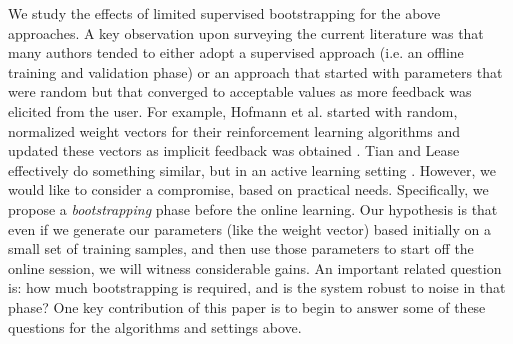 \documentclass{acm_proc_article-sp}
\begin{document}
We study the effects of limited supervised bootstrapping for the above approaches. A key observation upon surveying the current literature was that many authors tended to either adopt a supervised approach (i.e. an offline training and validation phase) or an approach that started with parameters that were random but that converged to acceptable values as more feedback was elicited from the user. For example, Hofmann et al. started with random, normalized weight vectors for their reinforcement learning algorithms and updated these vectors as implicit feedback was obtained \cite{hofmann}. Tian and Lease effectively do something similar, but in an active learning setting \cite{aibo}. However, we would like to consider a compromise, based on practical needs. Specifically, we propose a \emph{bootstrapping} phase before the online learning. Our hypothesis is that even if we generate our parameters (like the weight vector) based initially on a small set of training samples, and then use those parameters to start off the online session, we will witness considerable gains. An important related question is: how much bootstrapping is required, and is the system robust to noise in that phase? One key contribution of this paper is to begin to answer some of these questions for the algorithms and settings above.  
\\ \\
\end{document}
